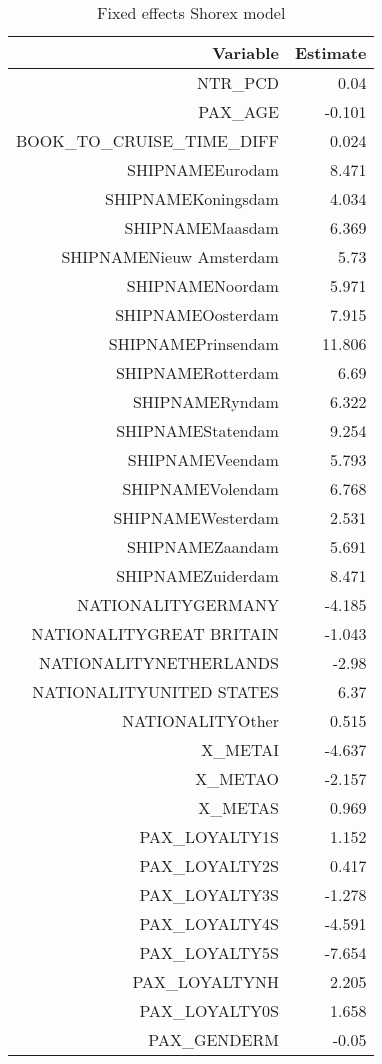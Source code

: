 \documentclass{article}
\begin{document}
\begin{table}[H]
	\centering 
	\begin{tabular}{rr}
		Variable & Estimate \\
		\hline 
		\hline 
		NTR\_PCD                   & 	0.04    \\ 
		PAX\_AGE	                  &      -0.101 \\  
		BOOK\_TO\_CRUISE\_TIME\_DIFF  &      0.024  \\ 
		SHIPNAMEEurodam	          &      8.471  \\ 
		SHIPNAMEKoningsdam	  &      4.034  \\ 
		SHIPNAMEMaasdam	          &      6.369  \\ 
		SHIPNAMENieuw Amsterdam	  &      5.73   \\
		SHIPNAMENoordam	          &      5.971  \\ 
		SHIPNAMEOosterdam         &    	7.915   \\
		SHIPNAMEPrinsendam	  &      11.806 \\  
		SHIPNAMERotterdam         &      6.69   \\
		SHIPNAMERyndam	          &      6.322  \\ 
		SHIPNAMEStatendam	  &      9.254  \\ 
		SHIPNAMEVeendam	          &      5.793  \\ 
		SHIPNAMEVolendam	  &      6.768  \\ 
		SHIPNAMEWesterdam	  &      2.531  \\ 
		SHIPNAMEZaandam	          &      5.691  \\ 
		SHIPNAMEZuiderdam	  &       8.471 \\  
		NATIONALITYGERMANY        &      -4.185 \\  
		NATIONALITYGREAT BRITAIN  &      -1.043 \\  
		NATIONALITYNETHERLANDS	  &     -2.98   \\   
		NATIONALITYUNITED STATES  &      6.37   \\   
		NATIONALITYOther          &      0.515  \\   
		X\_METAI	                  &     -4.637  \\    
		X\_METAO	                  &     -2.157  \\  
		X\_METAS	                  &     0.969   \\  
		PAX\_LOYALTY1S             &      1.152  \\  
		PAX\_LOYALTY2S             &      0.417  \\  
		PAX\_LOYALTY3S    	  &     -1.278  \\  
		PAX\_LOYALTY4S    	  &     -4.591  \\    
		PAX\_LOYALTY5S             &      -7.654 \\   
		PAX\_LOYALTYNH             &      2.205  \\    
		PAX\_LOYALTY0S	          &      1.658  \\  
		PAX\_GENDERM	          &      -0.05  \\  
		\hline 
		\hline 
	\end{tabular}
	\caption{Fixed effects Shorex model}
\end{table}
	
\end{document}
